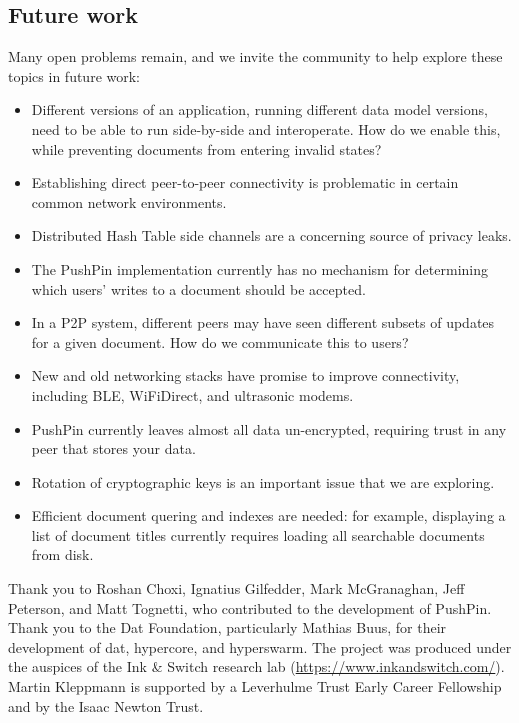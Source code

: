 \documentclass[sigplan,10pt]{acmart}
\begin{document}
\subsection{Future work}
Many open problems remain, and we invite the community to help explore these topics in future work:
\begin{itemize}
    \item Different versions of an application, running different data model versions, need to be able to run side-by-side and interoperate. How do we enable this, while preventing documents from entering invalid states?
    \item Establishing direct peer-to-peer connectivity is problematic in certain common network environments.
    \item Distributed Hash Table side channels are a concerning source of privacy leaks.
    \item The PushPin implementation currently has no mechanism for determining which users' writes to a document should be accepted.
    \item In a P2P system, different peers may have seen different subsets of updates for a given document. How do we communicate this to users?
    \item New and old networking stacks have promise to improve connectivity, including BLE, WiFiDirect, and ultrasonic modems.
    \item PushPin currently leaves almost all data un-encrypted, requiring trust in any peer that stores your data.
    \item Rotation of cryptographic keys is an important issue that we are exploring.
    \item Efficient document quering and indexes are needed: for example, displaying a list of document titles currently requires loading all searchable documents from disk.
\end{itemize}

\begin{acks}
Thank you to Roshan Choxi, Ignatius Gilfedder, Mark McGranaghan, Jeff Peterson, and Matt Tognetti, who contributed to the development of PushPin.
Thank you to the Dat Foundation, particularly Mathias Buus, for their development of dat, hypercore, and hyperswarm.
The project was produced under the auspices of the Ink \& Switch research lab (\url{https://www.inkandswitch.com/}).
Martin Kleppmann is supported by a Leverhulme Trust Early Career Fellowship and by the Isaac Newton Trust.
\end{acks}


{}
\end{document}
